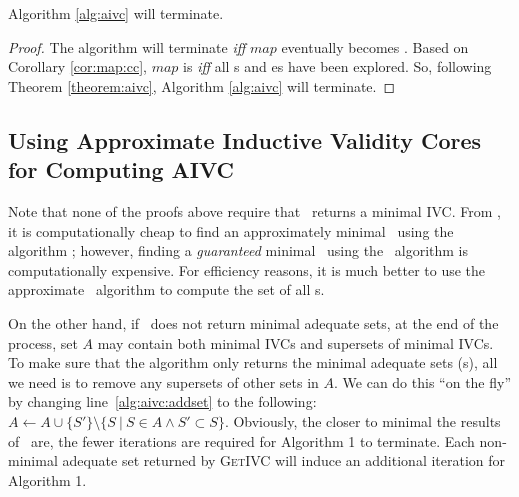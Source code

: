 \begin{theorem}
\label{theorem:termination}
  Algorithm \ref{alg:aivc} will terminate.
\end{theorem}
\begin{proof}
The algorithm will terminate \emph{iff} $map$ eventually becomes  \unsat.
Based on Corollary \ref{cor:map:cc}, $map$ is \unsat \emph{iff} all
\mivc s and \mis es have been explored.
So, following Theorem \ref{theorem:aivc},  Algorithm \ref{alg:aivc} will terminate.
\end{proof}

\subsection{Using Approximate Inductive Validity Cores for Computing AIVC}
Note that none of the proofs above require that \getivc\ returns a minimal IVC.
From \cite{Ghass16}, it is computationally cheap to find an
approximately minimal \ivc\ using the algorithm \ucalg; however, finding a {\em guaranteed}
minimal \ivc\ using the \ucbfalg\ algorithm is computationally expensive.  For efficiency
reasons, it is much better to use the approximate \ucalg\ algorithm to compute the set of
all \mivc s.

On the other hand, if \getivc ~does not return minimal adequate sets, at the end of the process,
set $A$ may contain both minimal IVCs and supersets of minimal IVCs. To make sure that the algorithm only returns
the minimal adequate sets (\mivc s), all we need is to remove any supersets of other sets in $A$.  We can do this ``on the fly'' by changing
line~\ref{alg:aivc:addset} to the following:
$A \leftarrow A \cup \{S'\} \setminus \{ S~|~S \in A \wedge S' \subset S \}$.
Obviously, the closer to minimal the results of \getivc ~are,
the fewer iterations are required for Algorithm 1 to terminate.  Each non-minimal adequate set returned by \textsc{GetIVC} will induce an additional iteration for Algorithm 1.



%


